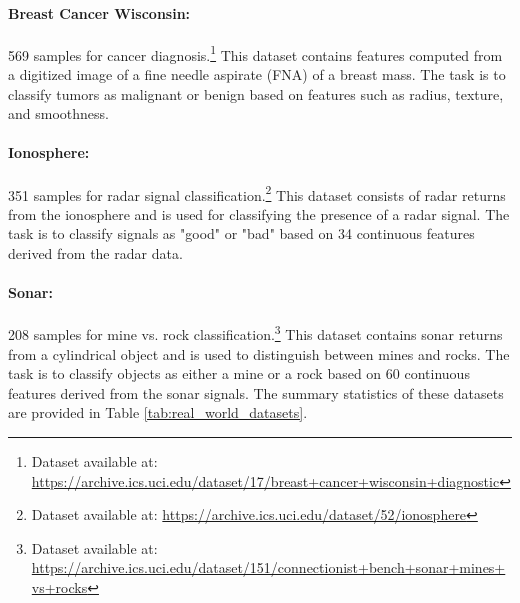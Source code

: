 \documentclass[12pt, a4paper]{article}
\begin{document}
\paragraph{Breast Cancer Wisconsin:} 569 samples for cancer diagnosis.\footnote{Dataset available at: \url{https://archive.ics.uci.edu/dataset/17/breast+cancer+wisconsin+diagnostic}} This dataset contains features computed from a digitized image of a fine needle aspirate (FNA) of a breast mass. The task is to classify tumors as malignant or benign based on features such as radius, texture, and smoothness.

\paragraph{Ionosphere:} 351 samples for radar signal classification.\footnote{Dataset available at: \url{https://archive.ics.uci.edu/dataset/52/ionosphere}} This dataset consists of radar returns from the ionosphere and is used for classifying the presence of a radar signal. The task is to classify signals as "good" or "bad" based on 34 continuous features derived from the radar data.

\paragraph{Sonar:} 208 samples for mine vs. rock classification.\footnote{Dataset available at: \url{https://archive.ics.uci.edu/dataset/151/connectionist+bench+sonar+mines+vs+rocks}} This dataset contains sonar returns from a cylindrical object and is used to distinguish between mines and rocks. The task is to classify objects as either a mine or a rock based on 60 continuous features derived from the sonar signals. The summary statistics of these datasets are provided in Table \ref{tab:real_world_datasets}.
\end{document}
